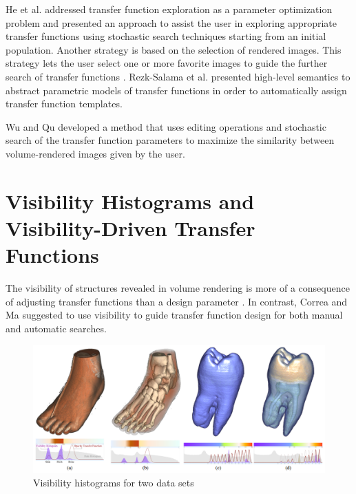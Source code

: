 He et al. \cite{he_generation_1996} addressed transfer function exploration as a parameter optimization problem and presented an approach to assist the user in exploring appropriate transfer functions using stochastic search techniques starting from an initial population.
Another strategy is based on the selection of rendered images. This strategy lets the user select one or more favorite images to guide the further search of transfer functions \cite{marks_design_1997}.
Rezk-Salama et al. \cite{rezk-salama_automatic_2000} presented high-level semantics to abstract parametric models of transfer functions in order to automatically assign transfer function templates.


\cite{tzeng_novel_2003}
\cite{tzeng_cluster-space_2004}
\cite{tzeng_intelligent_2005}

\cite{jani_opacity_2005}

Wu and Qu \cite{wu_interactive_2007} developed a method that uses editing operations and stochastic search of the transfer function parameters to maximize the similarity between volume-rendered images given by the user.

\cite{peng_optimal_2011}
\cite{lathen_automatic_2012}


\section{Visibility Histograms and Visibility-Driven Transfer Functions}
The visibility of structures revealed in volume rendering is more of a consequence of adjusting transfer functions than a design parameter \cite{preim_visual_2013}. In contrast, Correa and Ma \cite{correa_visibility-driven_2009} suggested to use visibility to guide transfer function design for both manual and automatic searches.

\begin{figure}
\centering
\includegraphics[width=1\linewidth]{images/correa_visibility-driven_2009}
\caption{Visibility histograms for two data sets \cite{correa_visibility-driven_2009}}
\label{fig:correa_visibility-driven_2009}
\end{figure}

